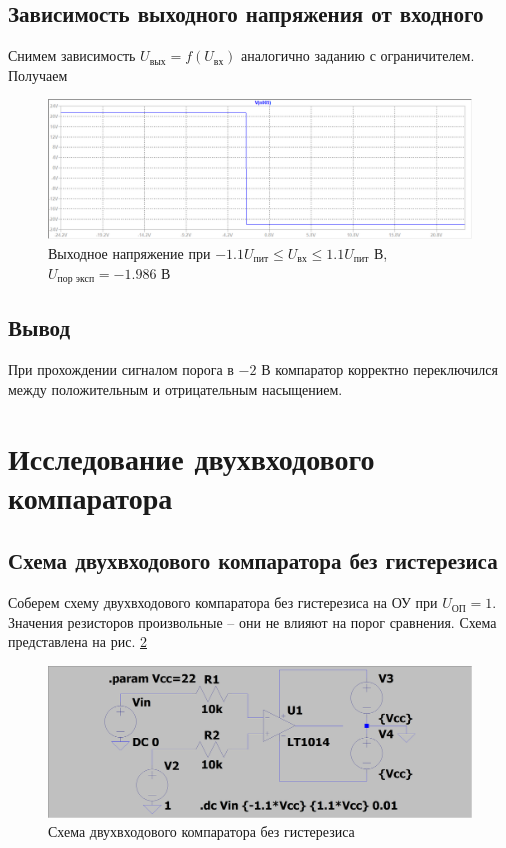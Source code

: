 \documentclass[a4paper, 12pt]{article}
\begin{document}
    
    \subsection{Зависимость выходного напряжения от входного}
    Снимем зависимость $U_\text{вых}=f\left( U_\text{вх} \right)$ аналогично
    заданию с ограничителем. Получаем
    \begin{figure}[H]
        \centering
        \includegraphics[scale=0.46]{4task_fuin.png}
        \captionsetup{skip=0pt}
        \caption{Выходное напряжение при $-1.1U_\text{пит}\leq U_\text{вх}\leq 1.1U_\text{пит}$ В, $U_\text{пор эксп}=-1.986$ В}
        \label{fig:4task_fuin}
    \end{figure}


    \subsection{Вывод}
    При прохождении сигналом порога в $-2$ В компаратор корректно
    переключился между положительным и отрицательным насыщением.

    
    \section{Исследование двухвходового компаратора}
    \subsection{Схема двухвходового компаратора без гистерезиса}
    Соберем схему двухвходового компаратора без гистерезиса на ОУ при $U_\text{ОП}=1$.
    Значения резисторов произвольные -- они не влияют на порог сравнения.
    Схема представлена на рис. \ref{fig:scheme7}
    \begin{figure}[H]
        \centering
        \includegraphics[scale=0.22]{scheme7.png}
        \captionsetup{skip=0pt}
        \caption{Схема двухвходового компаратора без гистерезиса}
        \label{fig:scheme7}
    \end{figure}
\end{document}
